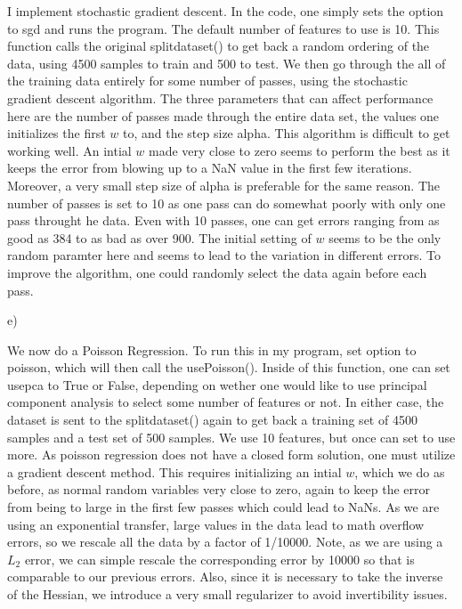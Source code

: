 \documentclass[12pt]{article}
\theoremstyle{plain}
\theoremstyle{definition}
\begin{document}
\begin{enumerate}
I implement stochastic gradient descent. In the code, one simply sets the option to sgd and runs the program. The default number of features to use is 10. This function calls the original splitdataset() to get back a random ordering of the data, using 4500 samples to train and 500 to test. We then go through the all of the training data entirely for some number of passes, using the stochastic gradient descent algorithm. The three parameters that can affect performance here are the number of passes made through the entire data set, the values one initializes the first $w$ to, and the step size alpha. This algorithm is difficult to get working well. An intial $w$ made very close to zero seems to perform the best as it keeps the error from blowing up to a NaN value in the first few iterations. Moreover, a very small step size of alpha is preferable for the same reason. The number of passes is set to 10 as one pass can do somewhat poorly with only one pass throught he data. Even with 10 passes, one can get errors ranging from as good as 384 to as bad as over 900. The initial setting of $w$ seems to be the only random paramter here and seems to lead to the variation in different errors. To improve the algorithm, one could randomly select the data again before each pass. 

e) 

We now do a Poisson Regression. To run this in my program, set option to poisson, which will then call the usePoisson(). Inside of this function, one can set usepca to True or False, depending on wether one would like to use principal component analysis to select some number of features or not. In either case, the dataset is sent to the splitdataset() again to get back a training set of 4500 samples and a test set of 500 samples. We use 10 features, but once can set to use more. As poisson regression does not have a closed form solution, one must utilize a gradient descent method. This requires initializing an intial $w$, which we do as before, as normal random variables very close to zero, again to keep the error from being to large in the first few passes which could lead to NaNs. As we are using an exponential transfer, large values in the data lead to math overflow errors, so we rescale all the data by a factor of 1/10000. Note, as we are using a $L_2$ error, we can simple rescale the corresponding error by 10000 so that is comparable to our previous errors. Also, since it is necessary to take the inverse of the Hessian, we introduce a very small regularizer to avoid invertibility issues.


\end{enumerate}
\end{document}
